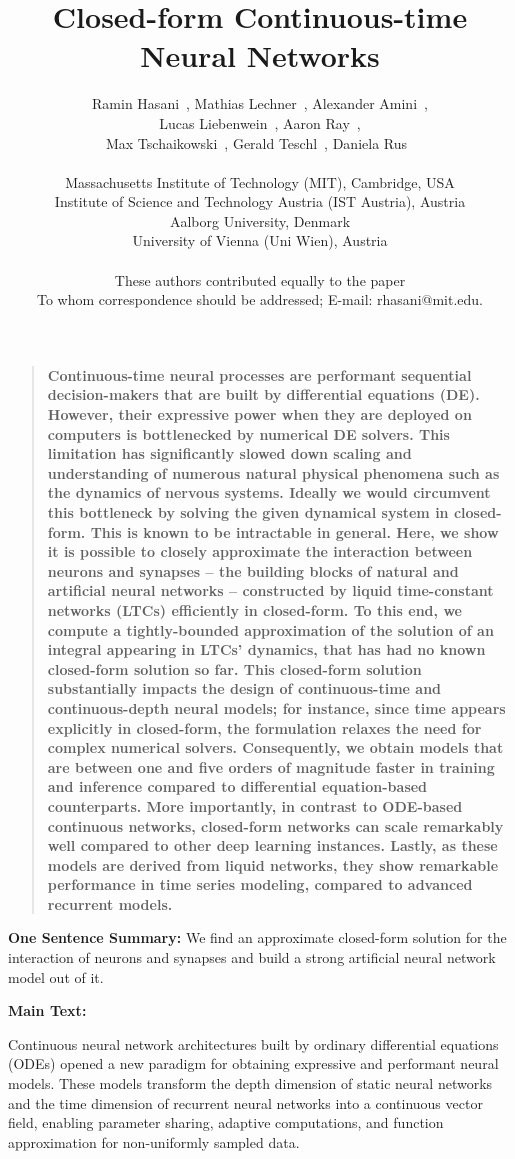 \documentclass[12pt]{article}
\title{Closed-form Continuous-time Neural Networks}
\author
{Ramin Hasani~, Mathias Lechner~, Alexander Amini~,\\ Lucas Liebenwein~, Aaron Ray~, \\
Max Tschaikowski~, Gerald Teschl~, Daniela Rus~\\
\\
\normalsize{Massachusetts Institute of Technology (MIT), Cambridge, USA}\\
\normalsize{Institute of Science and Technology Austria (IST Austria), Austria}\\
\normalsize{Aalborg University, Denmark}\\
\normalsize{University of Vienna (Uni Wien), Austria}\\
\\
\normalsize{These authors contributed equally to the paper}\\
\normalsize{To whom correspondence should be addressed; E-mail:  rhasani@mit.edu.}
}
\date{}
\newenvironment{sciabstract}{\begin{quote} \bf}
{\end{quote}}
\begin{document}
 



\baselineskip24pt



\maketitle 


\begin{sciabstract}
Continuous-time neural processes are performant sequential decision-makers that are built by differential equations (DE). However, their expressive power when they are deployed on computers is bottlenecked by numerical DE solvers. This limitation has significantly slowed down scaling and understanding of numerous natural physical phenomena such as the dynamics of nervous systems. Ideally we would circumvent this bottleneck by solving the given dynamical system in closed-form. This is known to be intractable in general. Here, we show it is possible to closely approximate the interaction between neurons and synapses -- the building blocks of natural and artificial neural networks -- constructed by liquid time-constant networks (LTCs) \cite{hasani2021liquid} efficiently in closed-form. 
To this end, we compute a tightly-bounded approximation of the solution of an integral appearing in LTCs' dynamics, that has had no known closed-form solution so far. This closed-form solution substantially impacts the design of continuous-time and continuous-depth neural models; for instance, since time appears explicitly in closed-form, the formulation relaxes the need for complex numerical solvers. Consequently, we obtain models that are between one and five orders of magnitude faster in training and inference compared to differential equation-based counterparts. More importantly, in contrast to ODE-based continuous networks, closed-form networks can scale remarkably well compared to other deep learning instances. Lastly, as these models are derived from liquid networks, they show remarkable performance in time series modeling, compared to advanced recurrent models.
\end{sciabstract}

\noindent \textbf{One Sentence Summary:} We find an approximate closed-form solution for the interaction of neurons and synapses and build a strong artificial neural network model out of it.

\noindent \textbf{Main Text:}

\noindent Continuous neural network architectures built by ordinary differential equations (ODEs) \cite{chen2018neural} opened a new paradigm for obtaining expressive and performant neural models. These models transform the depth dimension of static neural networks and the time dimension of recurrent neural networks into a continuous vector field, enabling parameter sharing, adaptive computations, and function approximation for non-uniformly sampled data.
\end{document}
